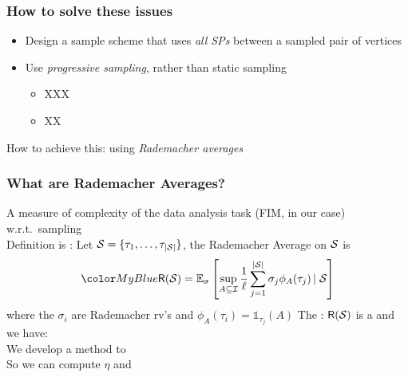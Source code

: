 \begin{frame}
  \frametitle{How to solve these issues}
  \begin{itemize}
    \item Design a sample scheme that uses \emph{all SPs} between a sampled pair
      of vertices
    \item Use \emph{progressive sampling}, rather than static sampling
      \begin{itemize}
        \item XXX
        \item XX
      \end{itemize}
  \end{itemize}
  \pause
  How to achieve this: using \emph{Rademacher averages}
\end{frame}

\begin{frame}
  \frametitle{What are Rademacher Averages?}
  A measure of complexity of the data analysis task (FIM, in our case)
  w.r.t.~sampling\\
  \quad {}
  \vfill
  Definition is : Let ${\cal S}=\{\tau_1,\dotsc,\tau_{|{\cal S}|}\}$, the Rademacher
  Average on ${\cal S}$ is
  \[
    \inblue{\Rade(\Sam)=\expectation_\sigma\left[\sup_{A\subseteq\mathcal{I}}\frac{1}{\ell}\sum_{j=1}^{|\Sam|}
    \sigma_j \phi_A(\tau_j)\left|\right. \Sam\right]}
  \]
  where the $\sigma_i$ are Rademacher rv's and $\phi_A(\tau_i)=\mathds{1}_{\tau_j}(A)$
  \vfill
  The : $\mathsf{R}({\cal S})$ is a  and we have:
  \[
  \]
  We develop a method to \\
  \quad So we can compute $\eta$ and 
\end{frame}

